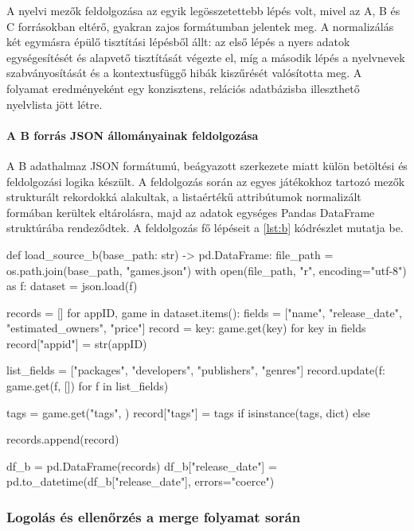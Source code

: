 A nyelvi mezők feldolgozása az egyik legösszetettebb lépés volt, mivel az A, B és C forrásokban eltérő, gyakran zajos formátumban jelentek meg. A normalizálás két egymásra épülő tisztítási lépésből állt: az első lépés a nyers adatok egységesítését és alapvető tisztítását végezte el, míg a második lépés a nyelvnevek szabványosítását és a kontextusfüggő hibák kiszűrését valósította meg. A folyamat eredményeként egy konzisztens, relációs adatbázisba illeszthető nyelvlista jött létre.

\paragraph{A B forrás JSON állományainak feldolgozása}

A B adathalmaz JSON formátumú, beágyazott szerkezete miatt külön betöltési és feldolgozási logika készült. A feldolgozás során az egyes játékokhoz tartozó mezők strukturált rekordokká alakultak, a listaértékű attribútumok normalizált formában kerültek eltárolásra, majd az adatok egységes Pandas DataFrame struktúrába rendeződtek. A feldolgozás fő lépéseit a \ref{lst:b} kódrészlet mutatja be.

\begin{python}[caption={B adathalmaz feldolgozása},captionpos=b,label={lst:b}]
def load_source_b(base_path: str) -> pd.DataFrame:
    file_path = os.path.join(base_path, "games.json")
    with open(file_path, "r", encoding="utf-8") as f:
        dataset = json.load(f)

    records = []
    for appID, game in dataset.items():
        fields = ["name", "release_date", "estimated_owners", "price"]
        record = {key: game.get(key) for key in fields}
        record["appid"] = str(appID)

        list_fields = ["packages", "developers", "publishers", "genres"]
        record.update({f: game.get(f, []) for f in list_fields})

        tags = game.get("tags", {})
        record["tags"] = tags if isinstance(tags, dict) else {}

        records.append(record)

    df_b = pd.DataFrame(records)
    df_b["release_date"] = pd.to_datetime(df_b["release_date"], 
    errors="coerce")
\end{python}

\subsubsection{Logolás és ellenőrzés a merge folyamat során}

